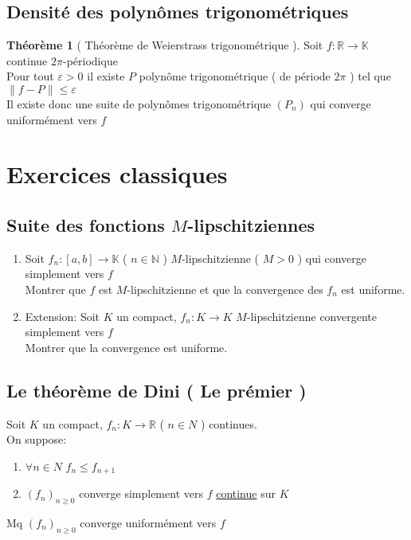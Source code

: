 \documentclass[10pt,a4paper]{article}
\theoremstyle{definition}
\newtheorem{theorem}[proposition]{Théorème}
\begin{document}
\subsection{Densité des polynômes trigonométriques}
\begin{theorem}[ Théorème de Weierstrass trigonométrique ]
    Soit $f: \mathbb{R} \to \mathbb{K}$ continue $2\pi$-périodique \\
    Pour tout $\varepsilon > 0$ il existe $P$ polynôme trigonométrique ( de période $2\pi$ ) tel que $\lVert f - P \rVert \leq \varepsilon$ \\
    Il existe donc une suite de polynômes trigonométrique $(P_n)$ qui converge uniformément vers $f$
\end{theorem}

\section{Exercices classiques}
\subsection{Suite des fonctions $M$-lipschitziennes}
\begin{enumerate}
    \item Soit $f_n: [a, b] \to \mathbb{K}$ ( $n \in \mathbb{N}$ ) $M$-lipschitzienne ( $M > 0$ ) qui converge simplement vers $f$ \\
    Montrer que $f$ est $M$-lipschitzienne et que la convergence des $f_n$ est uniforme.
    \item Extension: Soit $K$ un compact, $f_n: K \to K$ $M$-lipschitzienne convergente simplement vers $f$ \\
    Montrer que la convergence est uniforme.
\end{enumerate}

\subsection{Le théorème de Dini ( Le prémier )}
Soit $K$ un compact, $f_n: K \to \mathbb{R}$ ( $n \in N$ ) continues. \\
On suppose:
\begin{enumerate}
    \item $\forall n \in N$ $f_n \leq f_{n + 1}$
    \item $(f_n)_{n \geq 0}$ converge simplement vers $f$ \uline{continue} sur $K$
\end{enumerate}
Mq $(f_n)_{n \geq 0}$ converge uniformément vers $f$
\end{document}

